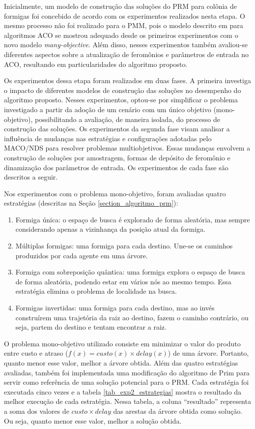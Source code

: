 Inicialmente, um modelo de construção das soluções do PRM para colônia de formigas foi concebido de acordo com os experimentos realizados nesta etapa. O mesmo processo não foi realizado para o PMM, pois o modelo descrito em \cite{Alaya2004} para algoritmos ACO se mostrou adequado desde os primeiros experimentos com o novo modelo \textit{many-objective}. Além disso, nesses experimentos também avaliou-se diferentes aspectos sobre a atualização de feromônios e parâmetros de entrada no ACO, resultando em particularidades do algoritmo proposto.

Os experimentos dessa etapa foram realizados em duas fases. A primeira investiga o impacto de diferentes modelos de construção das soluções no desempenho do algoritmo proposto. Nesses experimentos, optou-se por simplificar o problema investigado a partir da adoção de um cenário com um único objetivo (mono-objetivo), possibilitando a avaliação, de maneira isolada, do processo de construção das soluções. Os experimentos da segunda fase visam analisar a influência de mudanças nas estratégias e configurações adotadas pelo MACO/NDS para resolver problemas multiobjetivos. Essas mudanças envolvem a construção de soluções por amostragem, formas de depósito de feromônio e dinamização dos parâmetros de entrada. Os experimentos de cada fase são descritos a seguir.

Nos experimentos com o problema mono-objetivo, foram avaliadas quatro estratégias (descritas na Seção \ref{section_algoritmo_prm}):

\begin{enumerate}
	\item Formiga única: o espaço de busca é explorado de forma aleatória, mas sempre considerando apenas a vizinhança da posição atual da formiga.
	\item Múltiplas formigas: uma formiga para cada destino. Une-se os caminhos produzidos por cada agente em uma árvore.
	\item Formiga com sobreposição quântica: uma formiga explora o espaço de busca de forma aleatória, podendo estar em vários nós ao mesmo tempo. Essa estratégia elimina o problema de localidade na busca.
	\item Formigas invertidas: uma formiga para cada destino, mas ao invés construírem uma trajetória da raiz ao destino, fazem o caminho contrário, ou seja, partem do destino e tentam encontrar a raiz.
\end{enumerate}

O problema mono-objetivo utilizado consiste em minimizar o valor do produto entre custo e atraso ($f(x) = custo(x) \times delay(x)$) de uma árvore. Portanto, quanto menor esse valor, melhor a árvore obtida. Além das quatro estratégias avaliadas, também foi implementada uma modificação do algoritmo de Prim \cite{Prim1957} para servir como referência de uma solução potencial para o PRM. Cada estratégia foi executada cinco vezes e a tabela \ref{tab_exp2_estrategias} mostra o resultado da melhor execução de cada estratégia. Nessa tabela, a coluna ``resultado'' representa a soma dos valores de $custo \times delay$ das arestas da árvore obtida como solução. Ou seja, quanto menor esse valor, melhor a solução obtida.

